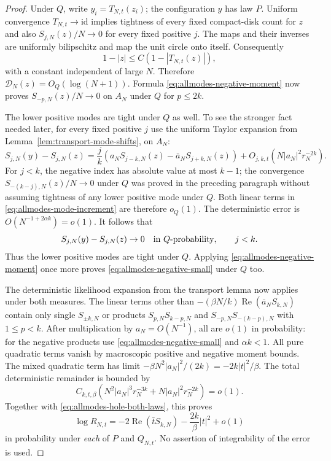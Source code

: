 \documentclass[11pt,a4paper]{article}
\numberwithin{equation}{section}
\theoremstyle{definition}
\theoremstyle{remark}
\begin{document}
\begin{proof}
Under $Q$, write $y_i=T_{N,t}(z_i)$; the configuration $y$ has law $P$.
Uniform convergence $T_{N,t}\to\mathrm{id}$ implies tightness of every
fixed compact-disk count for $z$ and also
$S_{j,N}(z)/N\to0$ for every fixed positive $j$. The maps and their
inverses are uniformly bilipschitz and map the unit circle onto itself.
Consequently
\[
 1-|z|\le C(1-|T_{N,t}(z)|),
\]
with a constant independent of large $N$. Therefore $\mathcal D_N(z)=O_Q(\log(N+1))$.
Formula \eqref{eq:allmodes-negative-moment} now proves
$S_{-p,N}(z)/N\to0$ on $A_N$ under $Q$ for $p\le2k$.

The lower positive modes are tight under $Q$ as well. To see the stronger
fact needed later, for every fixed positive $j$ use the uniform Taylor
expansion from Lemma~\ref{lem:transport-mode-shifts}, on $A_N$:
\begin{equation}\label{eq:allmodes-mode-increment}
 S_{j,N}(y)-S_{j,N}(z)
 =\frac jk\left(a_NS_{j-k,N}(z)-\bar a_NS_{j+k,N}(z)\right)
   +O_{j,k,t}(N|a_N|^2r_N^{-2k}).
\end{equation}
For $j<k$, the negative index has absolute value at most $k-1$;
the convergence $S_{-(k-j),N}(z)/N\to0$ under $Q$ was proved in the
preceding paragraph without assuming tightness of any lower positive
mode under $Q$. Both linear terms in
\eqref{eq:allmodes-mode-increment} are therefore $o_Q(1)$.
The deterministic error is
$O(N^{-1+2\alpha k})=o(1)$. It follows that
\begin{equation}\label{eq:allmodes-lower-invariant}
 S_{j,N}(y)-S_{j,N}(z)\to0\quad\hbox{in }Q\hbox{-probability},\qquad j<k.
\end{equation}
Thus the lower positive modes are tight under $Q$. Applying
\eqref{eq:allmodes-negative-moment} once more proves
\eqref{eq:allmodes-negative-small} under $Q$ too.

The deterministic likelihood expansion from the transport lemma now applies
under both measures. The linear terms other than
$-(\beta N/k)\operatorname{Re}(\bar a_NS_{k,N})$ contain only single
$S_{\pm k,N}$ or products $S_{p,N}S_{k-p,N}$ and
$S_{-p,N}S_{-(k-p),N}$ with $1\le p<k$. After multiplication by
$a_N=O(N^{-1})$, all are $o(1)$ in probability: for the negative products
use \eqref{eq:allmodes-negative-small} and $\alpha k<1$.
All pure quadratic terms vanish by macroscopic positive and negative moment
bounds. The mixed quadratic term has limit
$-\beta N^2|a_N|^2/(2k)=-2k|t|^2/\beta$.
The total deterministic remainder is bounded by
\[
 C_{k,t,\beta}\left(N^2|a_N|^3r_N^{-3k}
                         +N|a_N|^2r_N^{-2k}\right)=o(1).
\]
Together with \eqref{eq:allmodes-hole-both-laws}, this proves
\begin{equation}\label{eq:allmodes-loglikelihood}
 \log R_{N,t}
 =-2\operatorname{Re}(\bar tS_{k,N})-\frac{2k}{\beta}|t|^2+o(1)
\end{equation}
in probability under \emph{each} of $P$ and $Q_{N,t}$.
No assertion of integrability of the error is used.


\end{proof}
\end{document}
